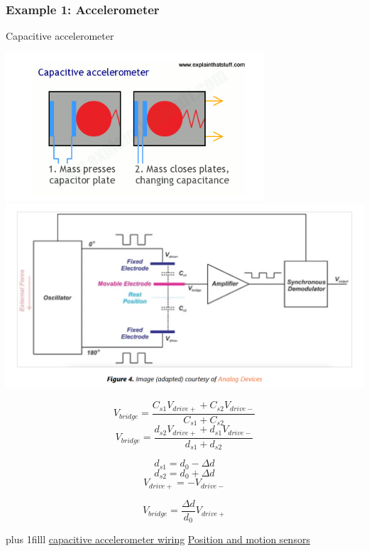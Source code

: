 \documentclass[fleqn]{beamer} %
\newcommand{\sectionIIsubsectionIIItitle}{Example 1: Accelerometer}
\newcommand{\btVFill}{\vskip0pt plus 1filll}
\begin{document}
			\begin{frame}
			\frametitle{\sectionIIsubsectionIIItitle}
			\scriptsize	
				Capacitive accelerometer    

 				\includegraphics[scale=.45]{images/Capacitance.png}
			 	\includegraphics[scale=.27]{images/syncdemod_cap_accel.png}
			 	
			 	\begin{multicols}{2}	
			 	\[V_{bridge}=\frac{ C_{s1}V_{drive+}+C_{s2}V_{drive-} }{ C_{s1}+C_{s2} }\]
			 	\[V_{bridge}=\frac{ d_{s2}V_{drive+}+d_{s1}V_{drive-} }{ d_{s1}+d_{s2} }\]

			 	\[d_{s1}=d_0-\Delta d\]
			 	\[d_{s2}=d_0+\Delta d\]
			 	\[V_{drive+}=-V_{drive-}\]

			 	\[V_{bridge}=\frac{\Delta d}{d_0}V_{drive+}\]	
			 	\end{multicols}	

			 	\btVFill	
			 	\href{https://www.allaboutcircuits.com/technical-articles/introduction-to-capacitive-accelerometer-measure-acceleration-capacitive-sensing/}{capacitive accelerometer wiring}
			 	\href{https://www.analog.com/media/en/training-seminars/design-handbooks/Practical-Design-Techniques-Sensor-Signal/Section6.PDF}{Position and motion sensors}

			\end{frame}
\end{document}
